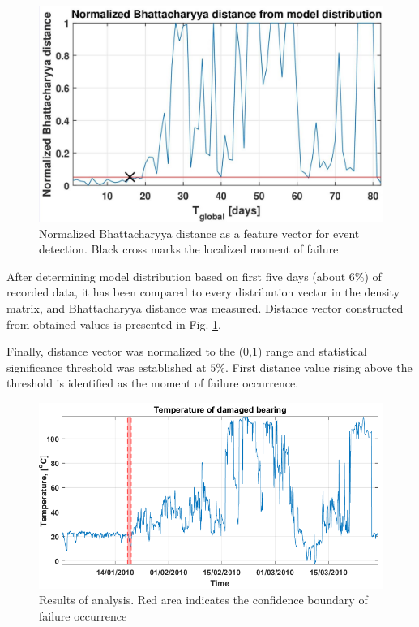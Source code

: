 \documentclass{svproc}
\begin{document}
\begin{figure}[ht!]
\centering
\includegraphics[width=\textwidth]{figs/Fig06.jpg}
\vspace*{-10pt}
\caption{Normalized Bhattacharyya distance as a feature vector for event detection. Black cross marks the localized moment of failure}
\label{fig:duty}
\end{figure}

After determining model distribution based on first five days (about $6\%$) of recorded data, it has been compared to every distribution vector in the density matrix, and Bhattacharyya distance was measured. Distance vector constructed from obtained values is presented in Fig. \ref{fig:duty}.

Finally, distance vector was normalized to the (0,1) range and statistical significance threshold was established at $5\%$. First distance value rising above the threshold is identified as the moment of failure occurrence.

\begin{figure}[ht!]
\centering
\includegraphics[width=\textwidth]{figs/fig07.png}
\caption{Results of analysis. Red area indicates the confidence boundary of failure occurrence}
\label{fig:out}
\end{figure}
\end{document}
